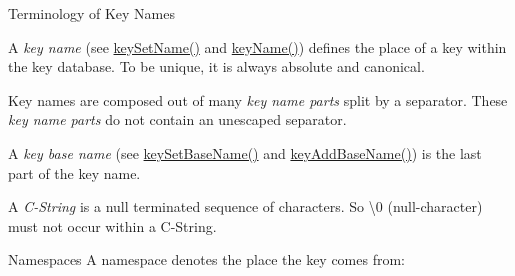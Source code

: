 \begin{DoxyParagraph}{Terminology of Key Names}

\begin{DoxyItemize}
\item A {\itshape key name} (see \mbox{\hyperlink{group__keyname_ga7699091610e7f3f43d2949514a4b35d9}{key\+Set\+Name()}} and \mbox{\hyperlink{group__keyname_ga8e805c726a60da921d3736cda7813513}{key\+Name()}}) defines the place of a key within the key database. To be unique, it is always absolute and canonical.
\item Key names are composed out of many {\itshape key name parts} split by a separator. These {\itshape key name parts} do not contain an unescaped separator.
\item A {\itshape key base name} (see \mbox{\hyperlink{group__keyname_ga6e804bd453f98c28b0ff51430d1df407}{key\+Set\+Base\+Name()}} and \mbox{\hyperlink{group__keyname_gaa942091fc4bd5c2699e49ddc50829524}{key\+Add\+Base\+Name()}}) is the last part of the key name.
\item A {\itshape C-\/\+String} is a null terminated sequence of characters. So \textbackslash{}0 (null-\/character) must not occur within a C-\/\+String.
\end{DoxyItemize}
\end{DoxyParagraph}
\begin{DoxyParagraph}{Namespaces}
A namespace denotes the place the key comes from\+:
\end{DoxyParagraph}

